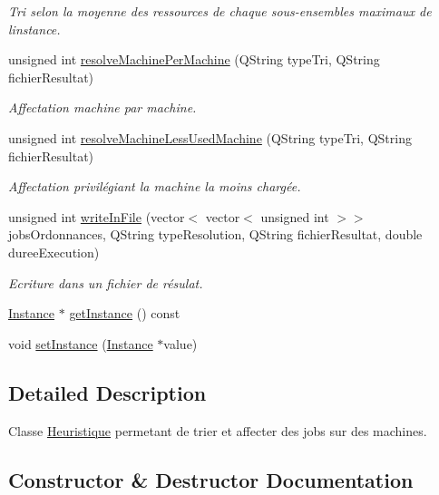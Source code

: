 \begin{DoxyCompactItemize}
\begin{DoxyCompactList}\small\item\em Tri selon la moyenne des ressources de chaque sous-\/ensembles maximaux de l\textquotesingle{}instance. \end{DoxyCompactList}\item 
unsigned int \hyperlink{classHeuristique_ad8a57ed34b0c46f6d65e501ee99da498}{resolve\+Machine\+Per\+Machine} (Q\+String type\+Tri, Q\+String fichier\+Resultat)
\begin{DoxyCompactList}\small\item\em Affectation machine par machine. \end{DoxyCompactList}\item 
unsigned int \hyperlink{classHeuristique_aee20a4baec95a33533a6e13029c437df}{resolve\+Machine\+Less\+Used\+Machine} (Q\+String type\+Tri, Q\+String fichier\+Resultat)
\begin{DoxyCompactList}\small\item\em Affectation privilégiant la machine la moins chargée. \end{DoxyCompactList}\item 
unsigned int \hyperlink{classHeuristique_a2aa8150a74e4b2b903cddacb22a2396b}{write\+In\+File} (vector$<$ vector$<$ unsigned int $>$$>$ jobs\+Ordonnances, Q\+String type\+Resolution, Q\+String fichier\+Resultat, double duree\+Execution)
\begin{DoxyCompactList}\small\item\em Ecriture dans un fichier de résulat. \end{DoxyCompactList}\item 
\hyperlink{classInstance}{Instance} $\ast$ \hyperlink{classHeuristique_aa84c0d4d8d2ff50462bc7e77079818e4}{get\+Instance} () const
\item 
void \hyperlink{classHeuristique_ab181d69cd0e2c8a7a28ac5fd9be0e214}{set\+Instance} (\hyperlink{classInstance}{Instance} $\ast$value)
\end{DoxyCompactItemize}


\subsection{Detailed Description}
Classe \hyperlink{classHeuristique}{Heuristique} permetant de trier et affecter des jobs sur des machines. 

\subsection{Constructor \& Destructor Documentation}
\mbox{\label{classHeuristique_a58630433c6bac8eec9a5888945eba479}} 
